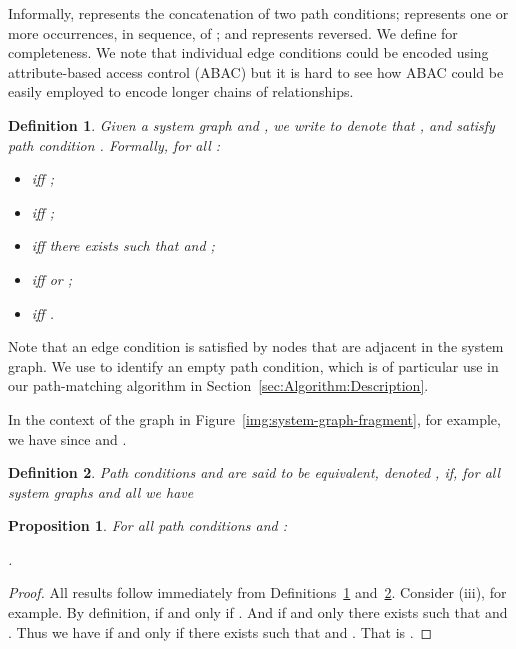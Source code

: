 \documentclass{article}
\newtheorem{definition}{Definition}
\newtheorem{proposition}{Proposition}
\begin{document}
Informally,  represents the concatenation of two path conditions;  represents one or more occurrences, in sequence, of ; and  represents  reversed.
We define  for completeness.
We note that individual edge conditions could be encoded using attribute-based access control (ABAC) but it is hard to see how ABAC could be easily employed to encode longer chains of relationships.

\begin{definition}\label{def:path-condition-semantics}
 Given a system graph  and , we write  to denote that  ,  and  \emph{satisfy path condition} .
 Formally, for all :
    \begin{itemize}
        \item  iff ;
        \item  iff ;
        \item  iff there exists  such that  and ;
        \item  iff  or ;
        \item  iff .
    \end{itemize}
\end{definition}

Note that an edge condition is satisfied by nodes that are adjacent in the system graph.
We use  to identify an empty path condition, which is of particular use in our path-matching algorithm in Section~\ref{sec:Algorithm:Description}.

In the context of the graph in Figure~\ref{img:system-graph-fragment}, for example, we have  since  and .

\begin{definition}\label{def:path-condition-equivalence}
 Path conditions  and  are said to be \emph{equivalent}, denoted , if, for all system graphs  and all  we have
  
\end{definition}

\begin{proposition}\label{pro:simple-equivalences}
For all path conditions  and :
   \begin{inparaenum}[\em (i)]
    \item 
    \item 
    \item 
    \item .
   \end{inparaenum}
\end{proposition}


\begin{proof}
 All results follow immediately from Definitions~\ref{def:path-condition-semantics} and~\ref{def:path-condition-equivalence}.
 Consider (iii), for example.
 By definition,  if and only if .
 And  if and only there exists  such that  and .
 Thus we have  if and only if there exists  such that  and .
 That is .
\end{proof}
\end{document}
